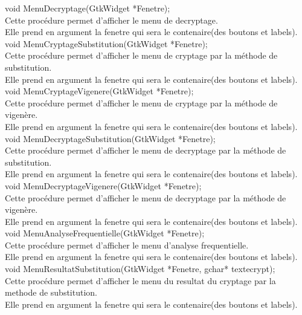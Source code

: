 \documentclass[a4]{article}
\begin{document}
	
	void MenuDecryptage(GtkWidget *Fenetre);\\
		Cette procédure permet d'afficher le menu de decryptage.\\
		Elle prend en argument la fenetre qui sera le contenaire(des boutons et labels).\\

	
	void MenuCryptageSubstitution(GtkWidget *Fenetre);\\
		Cette procédure permet d'afficher le menu de cryptage par la méthode de substitution.\\
		Elle prend en argument la fenetre qui sera le contenaire(des boutons et labels).\\

	
	void MenuCryptageVigenere(GtkWidget *Fenetre);\\
		Cette procédure permet d'afficher le menu de cryptage par la méthode de vigenère.\\
		Elle prend en argument la fenetre qui sera le contenaire(des boutons et labels).\\
	
	void MenuDecryptageSubstitution(GtkWidget *Fenetre);\\
		Cette procédure permet d'afficher le menu de decryptage par la méthode de substitution.\\
		Elle prend en argument la fenetre qui sera le contenaire(des boutons et labels).\\
	
	void MenuDecryptageVigenere(GtkWidget *Fenetre);\\
		Cette procédure permet d'afficher le menu de decryptage par la méthode de vigenère.\\
		Elle prend en argument la fenetre qui sera le contenaire(des boutons et labels).\\
	
	void MenuAnalyseFrequentielle(GtkWidget *Fenetre);\\
		Cette procédure permet d'afficher le menu d'analyse frequentielle.\\
		Elle prend en argument la fenetre qui sera le contenaire(des boutons et labels).\\
	
	void MenuResultatSubstitution(GtkWidget *Fenetre, gchar* textecrypt);\\
		Cette procédure permet d'afficher le menu du resultat du cryptage par la methode de substitution.\\
		Elle prend en argument la fenetre qui sera le contenaire(des boutons et labels).\\
	
\end{document}
